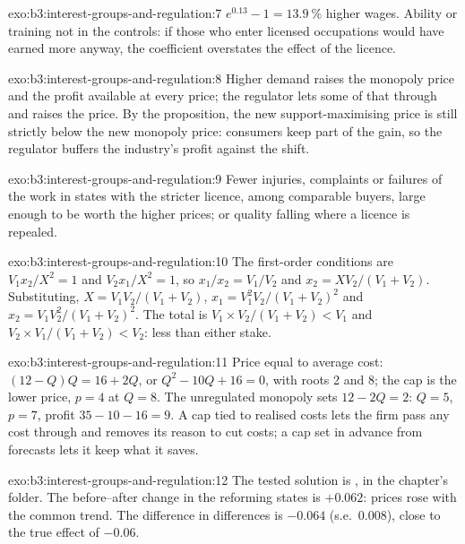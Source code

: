\begin{solution}{exo:b3:interest-groups-and-regulation:7}
$e^{0.13} - 1 = 13.9~\%$ higher wages. Ability or training not in the controls: if those who
enter licensed occupations would have earned more anyway, the coefficient
overstates the effect of the licence.
\end{solution}

\begin{solution}{exo:b3:interest-groups-and-regulation:8}
Higher demand raises the monopoly price and the profit available at every price;
the regulator lets some of that through and raises the price. By the proposition,
the new support-maximising price is still strictly below the new monopoly price:
consumers keep part of the gain, so the regulator buffers the industry's profit
against the shift.
\end{solution}

\begin{solution}{exo:b3:interest-groups-and-regulation:9}
Fewer injuries, complaints or failures of the work in states with the stricter
licence, among comparable buyers, large enough to be worth the higher prices; or
quality falling where a licence is repealed.
\end{solution}

\begin{solution}{exo:b3:interest-groups-and-regulation:10}
The first-order conditions are $V_1x_2/X^2 = 1$ and $V_2x_1/X^2 = 1$, so $x_1/x_2 = V_1/V_2$ and $x_2 = XV_2/(V_1 + V_2)$.
Substituting, $X = V_1V_2/(V_1 + V_2)$, $x_1 = V_1^2V_2/(V_1 + V_2)^2$ and $x_2 = V_1V_2^2/(V_1 + V_2)^2$. The total is $V_1 \times V_2/(V_1 + V_2) <
V_1$ and $V_2 \times V_1/(V_1 + V_2) < V_2$: less than either stake.
\end{solution}

\begin{solution}{exo:b3:interest-groups-and-regulation:11}
Price equal to average cost: $(12 - Q)Q = 16 + 2Q$, or $Q^2 - 10Q + 16 = 0$, with roots 2 and 8; the cap
is the lower price, $p = 4$ at $Q = 8$. The unregulated monopoly sets $12 - 2Q = 2$: $Q = 5$, $p = 7$, profit
$35 - 10 - 16 = 9$. A cap tied to realised costs lets the firm pass any cost through and
removes its reason to cut costs; a cap set in advance from forecasts lets it keep
what it saves.
\end{solution}

\begin{solution}{exo:b3:interest-groups-and-regulation:12}
The tested solution is , in the chapter's 
folder. The before--after change in the reforming states is $+0.062$: prices rose with
the common trend. The difference in differences is $-0.064$ (s.e.\ 0.008), close to the
true effect of $-0.06$. %
\end{solution}


